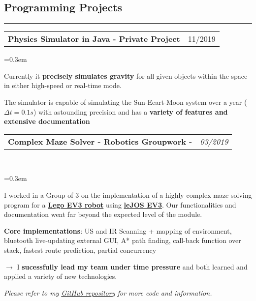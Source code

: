 \documentclass[10pt,letterpaper]{article}
\makeatletter
\newcommand{\headerrow}[2]
{\begin{tabular*}{\linewidth}{l@{\extracolsep{\fill}}r}
	#1 &
	#2 \\
\end{tabular*}}
\makeatother
\begin{document}
\subsection*{\Large{Programming Projects}}
\hrule
\vspace{0.4em}
\noindent
\headerrow{\textbf{Physics Simulator in Java - Private Project}}{11/2019}
\vspace{-1.6em}
\begin{itemize*}
	\parskip=0.3em
	\item Currently it \textbf{precisely simulates gravity} for all given objects within the space in either high-speed or real-time mode.
	\item The simulator is capable of simulating the Sun-Eeart-Moon system over a year ($\Delta t = 0.1s$) with astounding precision and has a \textbf{variety of features and extensive documentation}
\end{itemize*}

\noindent
\headerrow{\textbf{Complex Maze Solver - Robotics Groupwork - \fbox{20/20}}}{\emph{03/2019}}
\\
\vspace{-1.6em}
\begin{itemize*}
	\parskip=0.3em
	\item I worked in a Group of 3 on the implementation of a highly complex maze solving program for a \href{https://education.lego.com/en-gb/product/mindstorms-ev3}{\textbf{Lego EV3 robot}} using \href{http://www.lejos.org/}{\textbf{leJOS EV3}}. Our functionalities and documentation went far beyond the expected level of the module.
	\item \textbf{Core implementations}: US and IR Scanning + mapping of environment, bluetooth live-updating external GUI, A* path finding, 
	call-back function over stack, fastest route prediction, partial concurrency
	\item[$\rightarrow$] I \textbf{sucessfully lead my team under time pressure} and both learned and applied a variety of new technologies.
\end{itemize*}

\noindent
\emph{Please refer to my \href{https://github.com/j0ner0n}{\underline{GitHub repository}} for more code and information.}
\end{document}
